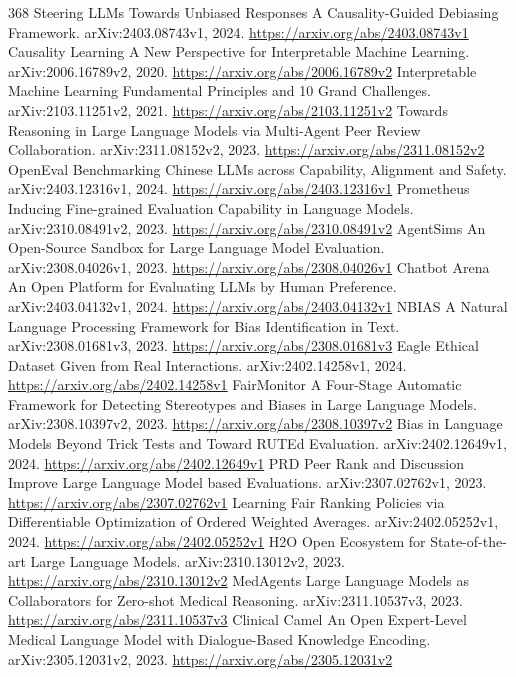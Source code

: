 \documentclass[11pt]{article}
\begin{document}
\begin{thebibliography}{368}
 Steering LLMs Towards Unbiased Responses A Causality-Guided Debiasing Framework. arXiv:2403.08743v1, 2024. \url{https://arxiv.org/abs/2403.08743v1}
 Causality Learning A New Perspective for Interpretable Machine Learning. arXiv:2006.16789v2, 2020. \url{https://arxiv.org/abs/2006.16789v2}
 Interpretable Machine Learning Fundamental Principles and 10 Grand Challenges. arXiv:2103.11251v2, 2021. \url{https://arxiv.org/abs/2103.11251v2}
 Towards Reasoning in Large Language Models via Multi-Agent Peer Review Collaboration. arXiv:2311.08152v2, 2023. \url{https://arxiv.org/abs/2311.08152v2}
 OpenEval Benchmarking Chinese LLMs across Capability, Alignment and Safety. arXiv:2403.12316v1, 2024. \url{https://arxiv.org/abs/2403.12316v1}
 Prometheus Inducing Fine-grained Evaluation Capability in Language Models. arXiv:2310.08491v2, 2023. \url{https://arxiv.org/abs/2310.08491v2}
 AgentSims An Open-Source Sandbox for Large Language Model Evaluation. arXiv:2308.04026v1, 2023. \url{https://arxiv.org/abs/2308.04026v1}
 Chatbot Arena An Open Platform for Evaluating LLMs by Human Preference. arXiv:2403.04132v1, 2024. \url{https://arxiv.org/abs/2403.04132v1}
 NBIAS A Natural Language Processing Framework for Bias Identification in Text. arXiv:2308.01681v3, 2023. \url{https://arxiv.org/abs/2308.01681v3}
 Eagle Ethical Dataset Given from Real Interactions. arXiv:2402.14258v1, 2024. \url{https://arxiv.org/abs/2402.14258v1}
 FairMonitor A Four-Stage Automatic Framework for Detecting Stereotypes and Biases in Large Language Models. arXiv:2308.10397v2, 2023. \url{https://arxiv.org/abs/2308.10397v2}
 Bias in Language Models Beyond Trick Tests and Toward RUTEd Evaluation. arXiv:2402.12649v1, 2024. \url{https://arxiv.org/abs/2402.12649v1}
 PRD Peer Rank and Discussion Improve Large Language Model based Evaluations. arXiv:2307.02762v1, 2023. \url{https://arxiv.org/abs/2307.02762v1}
 Learning Fair Ranking Policies via Differentiable Optimization of Ordered Weighted Averages. arXiv:2402.05252v1, 2024. \url{https://arxiv.org/abs/2402.05252v1}
 H2O Open Ecosystem for State-of-the-art Large Language Models. arXiv:2310.13012v2, 2023. \url{https://arxiv.org/abs/2310.13012v2}
 MedAgents Large Language Models as Collaborators for Zero-shot Medical Reasoning. arXiv:2311.10537v3, 2023. \url{https://arxiv.org/abs/2311.10537v3}
 Clinical Camel An Open Expert-Level Medical Language Model with Dialogue-Based Knowledge Encoding. arXiv:2305.12031v2, 2023. \url{https://arxiv.org/abs/2305.12031v2}

\end{thebibliography}
\end{document}
